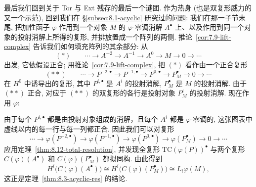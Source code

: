 最后我们回到关于 Tor 与 Ext 残存的最后一个谜团. 作为热身 (也是双复形威力的又一个示范), 回到我们在 \S\ref{subsec:8.1-acyclic} 研究过的问题: 我们在那一子节末尾, 把加性函子 $\varphi$ 作用到一个对象 $M$ 的 $\varphi$-零调消解 $A^\bullet$ 上、以及作用到同一个对象的投射消解上所得的复形, 并排放置成一个阵列的两侧. 推论~\ref{cor:7.9-lift-complex} 告诉我们如何填充阵列的其余部分: 从
\[
(*)\qquad \cdots \longrightarrow A^{-2}\longrightarrow A^{-1}\longrightarrow A^0\longrightarrow M\longrightarrow 0\longrightarrow \cdots
\]
出发, 它依假设正合; 用推论~\ref{cor:7.9-lift-complex}, 把 $(*)$ 看作由一个正合复形
\[
(**)\qquad \cdots \longrightarrow P^{-2,\bullet}\longrightarrow P^{-1,\bullet}\longrightarrow P^{0,\bullet}\longrightarrow P_M^\bullet\longrightarrow 0\longrightarrow \cdots
\]
在 $H^0$ 中诱导出的复形, 其中 $P^{i,\bullet}$ 是 $A^i$ 的投射消解, $P_M^\bullet$ 是 $M$ 的投射消解. 由于 $(**)$ 正合, 对应于 $(**)$ 的双复形的各行是投射对象 $P_M^i$ 的投射消解. 现在作用 $\varphi$:
\begin{center}
\end{center}
由于每个 $P^{i,\bullet}$ 都是由投射对象组成的消解，且每个 $A^i$ 都是 $\varphi$-零调的, 这张图表中虚线以内的每一行与每一列都正合. 因此我们可以对复形
\[
\cdots \longrightarrow \varphi(P^{-2,\bullet})\longrightarrow \varphi(P^{-1,\bullet})\longrightarrow \varphi(P^{0,\bullet})\longrightarrow \varphi(P_M^\bullet)\longrightarrow 0\longrightarrow \cdots
\]
应用定理~\ref{thm:8.12-total-resolution}, 并发现全复形 $\mathrm{TC}(\varphi(P))^\bullet$ 与两个复形 $C(\varphi)(A^\bullet)$ 和 $C(\varphi)(P_M^\bullet)$ 都拟同构. 由此得到
\[
H^i\bigl(C(\varphi)(A^\bullet)\bigr)\cong H^i\bigl(C(\varphi)(P_M^\bullet)\bigr)\cong L_i\varphi(M),
\]
这正是定理~\ref{thm:8.3-acyclic-res} 的结论.

